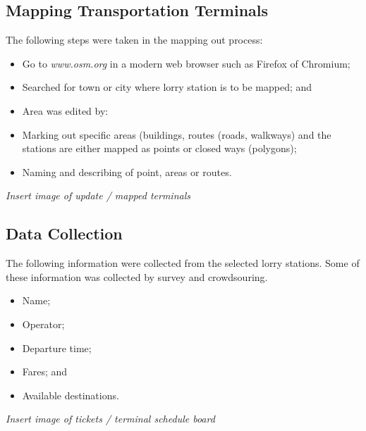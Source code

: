 \subsection{Mapping Transportation Terminals}
The following steps were taken in the mapping out process:
\begin{itemize}
	\item Go to \textit{www.osm.org} in a modern web browser such as Firefox of Chromium; 
	\item Searched for town or city where lorry station is to be mapped; and 
	\item Area was edited by: 
	\item Marking out specific areas (buildings, routes (roads, walkways) and the stations are either mapped as points or closed ways (polygons);  
	\item Naming  and describing of point, areas or routes. 
\end{itemize}

\textit{Insert image of update / mapped terminals}

\subsection{Data Collection}
The following information were collected from the selected lorry stations. Some of these information was collected by survey and crowdsouring.
\begin{itemize}
	\item Name;
	\item Operator;
	\item Departure time;
	\item Fares; and 
	\item Available destinations.
\end{itemize}

\textit{Insert image of tickets / terminal schedule board}


